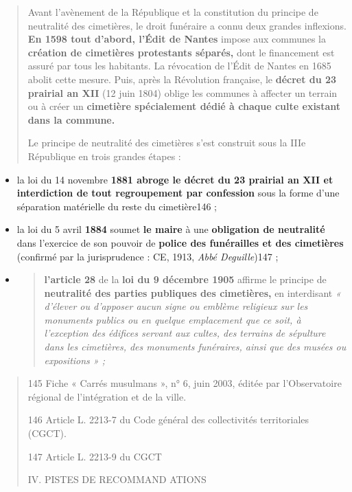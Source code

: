 \begin{quote}
Avant l'avènement de la République et la constitution du principe de
neutralité des cimetières, le droit funéraire a connu deux grandes
inflexions. \textbf{En 1598 tout d'abord, l'Édit de Nantes} impose aux
communes la \textbf{création de cimetières protestants séparés,} dont le
financement est assuré par tous les habitants. La révocation de l'Édit
de Nantes en 1685 abolit cette mesure. Puis, après la Révolution
française, le \textbf{décret du 23 prairial an XII} (12 juin 1804)
oblige les communes à affecter un terrain ou à créer un
\textbf{cimetière spécialement dédié à chaque culte existant dans la
commune.}

Le principe de neutralité des cimetières s'est construit sous la IIIe
République en trois grandes étapes :
\end{quote}

\begin{itemize}
\item
  la loi du 14 novembre \textbf{1881 abroge le décret du 23 prairial an
  XII et interdiction de tout regroupement par confession} sous la forme
  d'une séparation matérielle du reste du cimetière146 ;
\item
  la loi du 5 avril \textbf{1884} soumet \textbf{le maire} à une
  \textbf{obligation de neutralité} dans l'exercice de son pouvoir de
  \textbf{police des funérailles et des cimetières} (confirmé par la
  jurisprudence : CE, 1913, \emph{Abbé Deguille})147 ;
\item
  \begin{quote}
  \textbf{l'article 28} de la \textbf{loi du 9 décembre 1905} affirme le
  principe de \textbf{neutralité des parties publiques des cimetières,}
  en interdisant \emph{« d'élever ou d'apposer aucun signe ou emblème
  religieux sur les monuments publics ou en quelque emplacement que ce
  soit, à l'exception des édifices servant aux cultes, des terrains de
  sépulture dans les cimetières, des monuments funéraires, ainsi que des
  musées ou expositions » ;}
  \end{quote}
\end{itemize}

\begin{quote}
145 Fiche « Carrés musulmans », n° 6, juin 2003, éditée par
l'Observatoire régional de l'intégration et de la ville.

146 Article L. 2213-7 du Code général des collectivités territoriales
(CGCT).

147 Article L. 2213-9 du CGCT

IV. PISTES DE RECOMMAND ATIONS
\end{quote}

